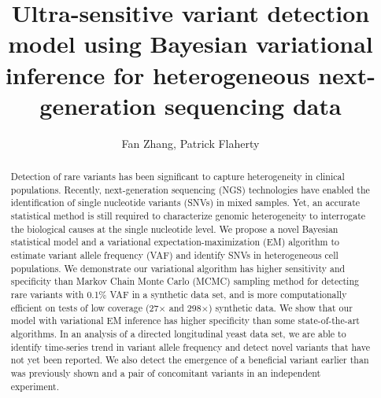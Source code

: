 \documentclass[11pt,reqno]{amsart}
\title[]{Ultra-sensitive variant detection model using Bayesian variational inference for heterogeneous next-generation sequencing data}
\author{Fan Zhang, Patrick Flaherty}
\begin{document}
\maketitle

\begin{abstract}
Detection of rare variants has been significant to capture heterogeneity in clinical populations.
Recently, next-generation sequencing (NGS) technologies have enabled the identification of single nucleotide variants (SNVs) in mixed samples.
Yet, an accurate statistical method is still required to characterize genomic heterogeneity to interrogate the biological causes at the single nucleotide level.
We propose a novel Bayesian statistical model and a variational expectation-maximization (EM) algorithm to estimate variant allele frequency (VAF) and identify SNVs in heterogeneous cell populations.
We demonstrate our variational algorithm has higher sensitivity and specificity than Markov Chain Monte Carlo (MCMC) sampling method for detecting rare variants with 0.1\% VAF in a synthetic data set,
and is more computationally efficient on tests of low coverage (27$\times$ and 298$\times$) synthetic data.
We show that our model with variational EM inference has higher specificity than some state-of-the-art algorithms.
In an analysis of a directed longitudinal yeast data set, we are able to identify time-series trend in variant allele frequency and detect novel variants that have not yet been reported.
We also detect the emergence of a beneficial variant earlier than was previously shown and a pair of concomitant variants in an independent experiment.

\end{abstract}
\end{document}
